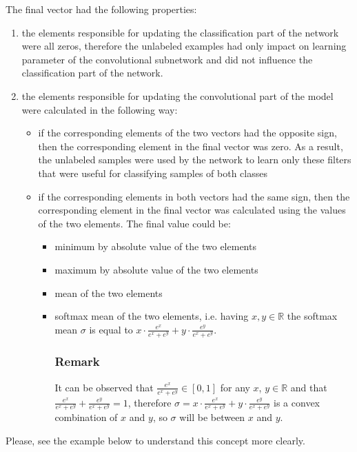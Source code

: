 \documentclass[a4paper,10pt]{report}
\begin{document}
           
      The final vector had the following properties:
      \begin{enumerate}
       \item the elements responsible for updating the classification part of the network were all zeros, therefore the unlabeled examples had only impact on learning parameter of the convolutional subnetwork and did not influence the classification part of the network. 
       \item the elements responsible for updating the convolutional part of the model were calculated in the following way:
	\begin{itemize}
	 \item if the corresponding elements of the two vectors had the opposite sign, then the corresponding element in the final vector was zero. As a result, the unlabeled samples were used by the network to learn only these filters that were useful for classifying samples of both classes
	  \item if the corresponding elements in both vectors had the same sign, then the corresponding element in the final vector was calculated using the values of the two elements. The final value could be:
	  \begin{itemize}
	    \item minimum by absolute value of the two elements
	    \item maximum by absolute value of the two elements
	    \item mean of the two elements
	    \item softmax mean of the two elements, i.e. having $x, y \in \mathbb{R}$ the softmax mean $\sigma$ is equal to $x \cdot \frac{e^x}{e^x + e^y} + y \cdot \frac{e^y}{e^x + e^y}$.
	    
	    \subsubsection{Remark}
	      It can be observed that $\frac{e^x}{e^x + e^y} \in [0, 1]$ for any $x$, $y \in \mathbb{R}$ and that $\frac{e^x}{e^x + e^y} + \frac{e^y}{e^x + e^y} = 1$, therefore $\sigma = x \cdot \frac{e^x}{e^x + e^y} + y \cdot \frac{e^y}{e^x + e^y}$ is a convex combination of $x$ and $y$, so $\sigma$ will be between $x$ and $y$. 
	  \end{itemize}
	\end{itemize}
      \end{enumerate}

      
      Please, see the example below to understand this concept more clearly.
            	
\end{document}
